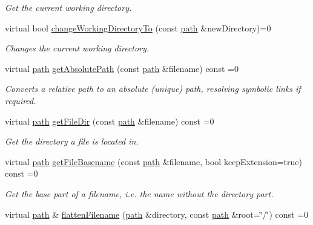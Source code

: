 \begin{DoxyCompactItemize}
\begin{DoxyCompactList}\small\item\em Get the current working directory. \end{DoxyCompactList}\item 
virtual bool \hyperlink{classirr_1_1io_1_1IFileSystem_a8859a2bed44815eeccc4fbcef189b073}{change\+Working\+Directory\+To} (const \hyperlink{namespaceirr_1_1io_ab1bdc45edb3f94d8319c02bc0f840ee1}{path} \&new\+Directory)=0
\begin{DoxyCompactList}\small\item\em Changes the current working directory. \end{DoxyCompactList}\item 
virtual \hyperlink{namespaceirr_1_1io_ab1bdc45edb3f94d8319c02bc0f840ee1}{path} \hyperlink{classirr_1_1io_1_1IFileSystem_ab135350f466da9ab896b6ec8e85a5c7e}{get\+Absolute\+Path} (const \hyperlink{namespaceirr_1_1io_ab1bdc45edb3f94d8319c02bc0f840ee1}{path} \&filename) const  =0
\begin{DoxyCompactList}\small\item\em Converts a relative path to an absolute (unique) path, resolving symbolic links if required. \end{DoxyCompactList}\item 
virtual \hyperlink{namespaceirr_1_1io_ab1bdc45edb3f94d8319c02bc0f840ee1}{path} \hyperlink{classirr_1_1io_1_1IFileSystem_a82a93a756a0d23a10464f2d925ebd6cd}{get\+File\+Dir} (const \hyperlink{namespaceirr_1_1io_ab1bdc45edb3f94d8319c02bc0f840ee1}{path} \&filename) const  =0
\begin{DoxyCompactList}\small\item\em Get the directory a file is located in. \end{DoxyCompactList}\item 
virtual \hyperlink{namespaceirr_1_1io_ab1bdc45edb3f94d8319c02bc0f840ee1}{path} \hyperlink{classirr_1_1io_1_1IFileSystem_a06e60c2df6231b872fa8eb47fe72e25e}{get\+File\+Basename} (const \hyperlink{namespaceirr_1_1io_ab1bdc45edb3f94d8319c02bc0f840ee1}{path} \&filename, bool keep\+Extension=true) const  =0
\begin{DoxyCompactList}\small\item\em Get the base part of a filename, i.\+e. the name without the directory part. \end{DoxyCompactList}\item 
virtual \hyperlink{namespaceirr_1_1io_ab1bdc45edb3f94d8319c02bc0f840ee1}{path} \& \hyperlink{classirr_1_1io_1_1IFileSystem_a4b7f6cde4107bd98f69089faeb2fb23c}{flatten\+Filename} (\hyperlink{namespaceirr_1_1io_ab1bdc45edb3f94d8319c02bc0f840ee1}{path} \&directory, const \hyperlink{namespaceirr_1_1io_ab1bdc45edb3f94d8319c02bc0f840ee1}{path} \&root=\char`\"{}/\char`\"{}) const  =0\hypertarget{classirr_1_1io_1_1IFileSystem_a4b7f6cde4107bd98f69089faeb2fb23c}{}\label{classirr_1_1io_1_1IFileSystem_a4b7f6cde4107bd98f69089faeb2fb23c}


\end{DoxyCompactItemize}
